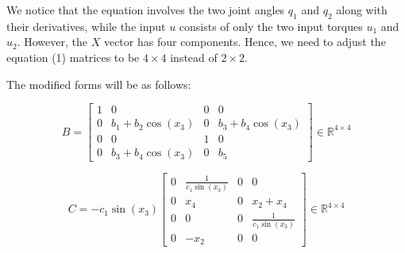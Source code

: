 \documentclass[a4paper, 12pt]{report}
\begin{document}
We notice that the equation involves the two joint angles \( q_1 \) and \( q_2 \) along with their derivatives, while the input \( u \) consists of only the two input torques \( u_1 \) and \( u_2 \). However, the \( X \) vector has four components. Hence, we need to adjust the equation (1) matrices to be \( 4 \times 4 \) instead of \( 2 \times 2 \).

The modified forms will be as follows:

$$B = \begin{bmatrix}
1 & 0 & 0 & 0 \\
0 & b_1 + b_2 \cos(x_3) & 0 & b_3 + b_4 \cos(x_3) \\
0 & 0 & 1 & 0 \\
0 & b_3 + b_4 \cos(x_3) & 0 & b_5
\end{bmatrix}  \in \mathbb{R}^{4 \times 4}$$

$$C = -c_1 \sin(x_3) \begin{bmatrix}
0 & \frac{1}{c_1 \sin(x_3)} & 0 & 0 \\
0 & x_4 & 0 & x_2 + x_4 \\
0 & 0 & 0 & \frac{1}{c_1 \sin(x_3)} \\
0 & -x_2 & 0 & 0
\end{bmatrix} \in \mathbb{R}^{4 \times 4}$$
\end{document}
